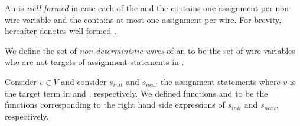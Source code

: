\begin{definition}
An \caig is {\em well formed} in case each of 
the  and the 
contains one assignment per non-wire variable and
the  contains at most 
one assignment per wire. 
For brevity, \caig hereafter denotes well 
formed \caig. 
\end{definition}



\begin{definition}
We define the set of {\em non-deterministic wires} of 
an \caig to be the set of wire variables who are not 
targets of assignment statements in .
\end{definition}



\begin{definition}
Consider $v\in V$ and consider $s_{init}$ and $s_{next}$ 
the assignment statements where $v$ is the target term in 
 and , respectively. 
We defined 
functions  and 
to be the functions corresponding to the right hand side 
expressions of $s_{init}$ and $s_{next}$, respectively. 
\end{definition}


